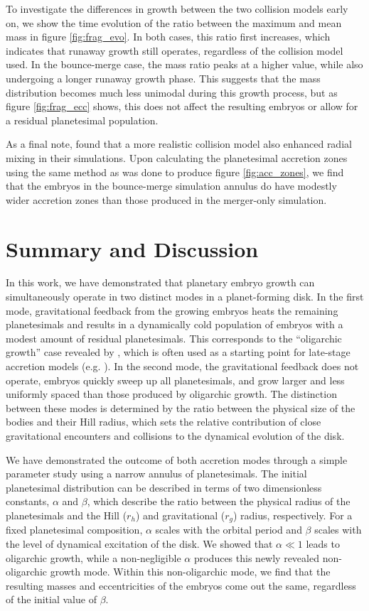 \documentclass[twocolumn,linenumbers]{aastex63}
\begin{document}
To investigate the differences in growth between the two collision models early on, we show the time evolution of the ratio 
between the maximum and mean mass in figure \ref{fig:frag_evo}. In both cases, this ratio first increases, which indicates that 
runaway growth still operates, regardless of the collision model used. In the bounce-merge case, the mass ratio peaks at a 
higher value, while also undergoing a longer runaway growth phase. This suggests that the mass distribution becomes much 
less unimodal during this growth process, but as figure \ref{fig:frag_ecc} shows, this does not affect the resulting embryos or 
allow for a residual planetesimal population.

As a final note, \citet{childs22} found that a more realistic collision model also enhanced radial mixing in their simulations. Upon 
calculating the planetesimal accretion zones using the same method as was done to produce figure \ref{fig:acc_zones}, we find 
that the embryos in the bounce-merge simulation annulus do have modestly wider accretion zones than those produced in the 
merger-only simulation.

\section{Summary and Discussion} \label{sec:discuss}

In this work, we have demonstrated that planetary embryo growth
can simultaneously operate in two distinct modes in a planet-forming disk. In the first
mode, gravitational feedback from the growing embryos heats the
remaining planetesimals and results in a dynamically cold population
of embryos with a modest amount of residual planetesimals. This
corresponds to the ``oligarchic growth'' case revealed by \citep{kokubo98}, which is often used as a starting point for late-stage 
accretion models (e.g. \citet{kokubo02, raymond05, raymond06}). In the second mode, the gravitational feedback does not 
operate, embryos quickly sweep up all planetesimals, and grow larger and less uniformly spaced than those produced by 
oligarchic growth. The distinction between these modes is determined
by the ratio between the physical size of the bodies and their 
Hill radius, which sets the relative contribution of close gravitational encounters and collisions to the dynamical evolution of the 
disk.

We have demonstrated the outcome of both accretion modes through a
simple parameter study using a narrow annulus of planetesimals. The initial planetesimal distribution can be described in terms of two dimensionless 
constants, $\alpha$ and $\beta$, which describe the ratio between the physical radius of the planetesimals and the Hill ($r_{h}$) 
and gravitational ($r_{g}$) radius, respectively. For a fixed planetesimal composition, $\alpha$ scales with the orbital period and 
$\beta$ scales with the level of dynamical excitation of the disk. We showed that $\alpha \ll 1$ leads to oligarchic growth, while a 
non-negligible $\alpha$ produces this newly revealed non-oligarchic growth mode. Within this non-oligarchic mode, we find that 
the resulting masses and eccentricities of the embryos come out the same, regardless of the initial value of $\beta$.
\end{document}
